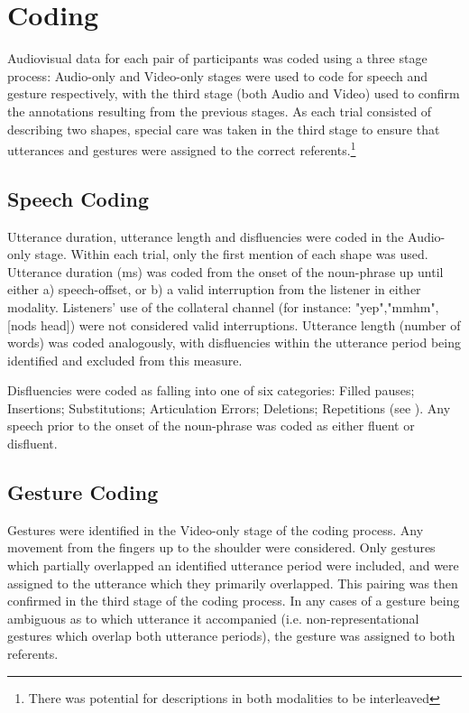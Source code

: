 \documentclass[a4paper,man,natbib]{apa6}
\begin{document}
\section{Coding}
Audiovisual data for each pair of participants was coded using a three stage process:
Audio-only and Video-only stages were used to code for speech and gesture respectively, with the third stage (both Audio and Video) used to confirm the annotations resulting from the previous stages.
As each trial consisted of describing two shapes, special care was taken in the third stage to ensure that utterances and gestures were assigned to the correct referents.\footnote{There was potential for descriptions in both modalities to be interleaved}



\subsection{Speech Coding}
Utterance duration, utterance length and disfluencies were coded in the Audio-only stage.
Within each trial, only the first mention of each shape was used. 
Utterance duration (ms) was coded from the onset of the noun-phrase up until either a) speech-offset, or b) a valid interruption from the listener in either modality.
Listeners' use of the collateral channel (for instance: "yep","mmhm",[nods head]) were not considered valid interruptions.
Utterance length (number of words) was coded analogously, with disfluencies within the utterance period being identified and excluded from this measure.

Disfluencies were coded as falling into one of six categories: Filled pauses; Insertions; Substitutions; Articulation Errors; Deletions; Repetitions (see \citet{Shriberg1996}).
Any speech prior to the onset of the noun-phrase was coded as either fluent or disfluent.

\subsection{Gesture Coding}
Gestures were identified in the Video-only stage of the coding process.
Any movement from the fingers up to the shoulder were considered. 
Only gestures which partially overlapped an identified utterance period were included, and were assigned to the utterance which they primarily overlapped. 
This pairing was then confirmed in the third stage of the coding process. 
In any cases of a gesture being ambiguous as to which utterance it accompanied (i.e. non-representational gestures which overlap both utterance periods), the gesture was assigned to both referents.
\end{document}
